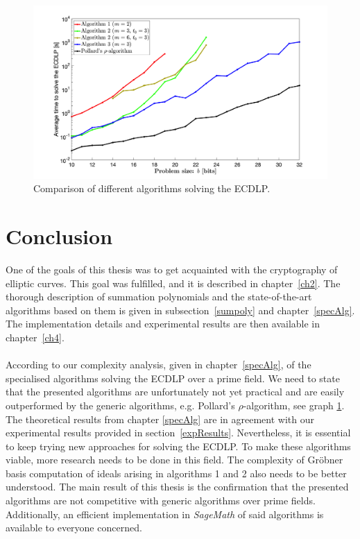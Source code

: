 \documentclass[thesis=M,english]{FITthesis}[2012/10/20]
\theoremstyle{remark}
\theoremstyle{definition}
\begin{document}
 \begin{figure}[h]
 \centering
 \hspace*{-1.3cm}
 	\includegraphics[width=1.21\textwidth]{algComparison.png}
 	\caption[Comparison of different algorithms solving the ECDLP]{Comparison of different algorithms solving the ECDLP.}
 	\label{grph1}
 \end{figure}

\chapter{Conclusion}
One of the goals of this thesis was to get acquainted with the cryptography of elliptic curves. This goal was fulfilled, and it is described in chapter~\ref{ch2}. The thorough description of summation polynomials and the state-of-the-art algorithms based on them is given in subsection~\ref{sumpoly} and chapter~\ref{specAlg}. The implementation details and experimental results are then available in chapter~\ref{ch4}. \\
\\
\noindent According to our complexity analysis, given in chapter~\ref{specAlg}, of the specialised algorithms solving the ECDLP over a prime field. We need to state that the presented algorithms are unfortunately not yet practical and are easily outperformed by the generic algorithms, e.g. Pollard's $\rho$-algorithm, see graph \ref{grph1}. The theoretical results from chapter \ref{specAlg} are in agreement with our experimental results provided in section~\ref{expResults}. Nevertheless, it is essential to keep trying new approaches for solving the ECDLP. To make these algorithms viable, more research needs to be done in this field. The complexity of Gröbner basis computation of ideals arising in algorithms 1 and 2 also needs to be better understood. The main result of this thesis is the confirmation that the presented algorithms are not competitive with generic algorithms over prime fields. Additionally, an efficient implementation in \textit{SageMath} of said algorithms is available to everyone concerned.
%
%

\end{document}
